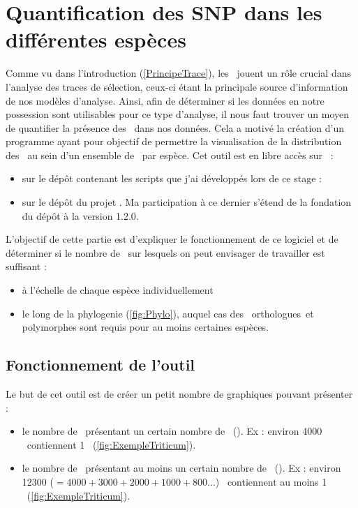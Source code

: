 \documentclass[../main]{subfiles} %
\begin{document}
\addto\extrasfrench{\protected\edef:{\unexpanded\expandafter{:}}}


\section{Quantification des SNP dans les différentes espèces}
\label{sec:SnpHeatmap}
Comme vu dans l'introduction (\cref{PrincipeTrace}), les \SNP jouent un rôle crucial dans l'analyse des traces de sélection, ceux-ci étant la principale source d'information de nos modèles d'analyse. Ainsi, afin de déterminer si les données en notre possession sont utilisables pour ce type d’analyse, il nous faut trouver un moyen de quantifier la présence des \SNP dans nos données. Cela a motivé la création d’un programme ayant pour objectif de permettre la visualisation de la distribution des \SNP au sein d’un ensemble de \contigs par espèce. Cet outil est en libre accès sur \GitHub :
\begin{itemize}
    \item sur le dépôt contenant les scripts que j'ai développés lors de ce stage : \cite{internship2024}
    \item sur le dépôt du projet \cite{snpheatmap}. Ma participation à ce dernier s'étend de la fondation du dépôt à la version 1.2.0.
\end{itemize}

L'objectif de cette partie est d'expliquer le fonctionnement de ce logiciel et de déterminer si le nombre de \contigs sur lesquels on peut envisager de travailler est suffisant :
\begin{itemize}
    \item à l’échelle de chaque espèce individuellement
    \item le long de la \gls{phylogenie} (\cref{fig:Phylo}), auquel cas des \contigs \glspl{orthologue} et polymorphes sont requis pour au moins certaines espèces.  
\end{itemize}


\subsection{Fonctionnement de l’outil} 
\label{sec:FonctionnementSNPHeatmap}
Le but de cet outil est de créer un petit nombre de graphiques pouvant présenter :

\begin{itemize}
    \item le nombre de \contigs présentant un certain nombre de \SNP (\GNSPeq). Ex : environ 
    \num{4000}
    \contigs contiennent 1 \SNP (\cref{fig:ExempleTriticum}).
    
    \item le  nombre de \contigs présentant au moins un certain nombre de \SNP (\GNSPge). Ex : environ \num{12 300} ($= \num{4 000} + \num{3 000} + \num{2 000} + \num{1 000} + \num{800} ...$) \contigs contiennent au moins 1 \SNP (\cref{fig:ExempleTriticum}). 
\end{itemize}
\end{document}
